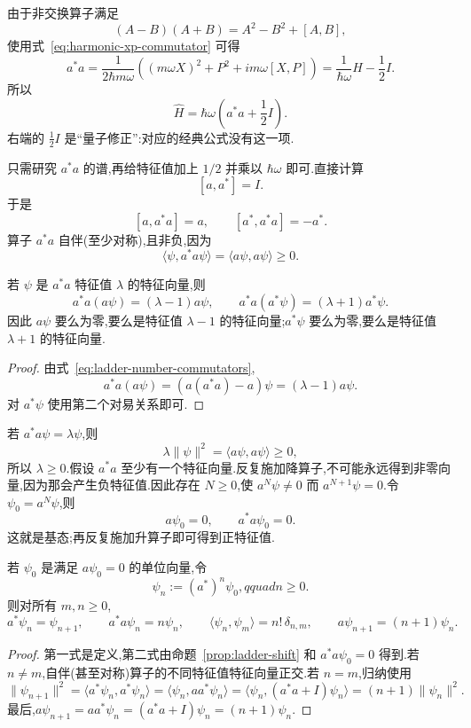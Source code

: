 由于非交换算子满足
\[
(A-B)(A+B)=A^{2}-B^{2}+[A,B],
\]
使用式~\eqref{eq:harmonic-xp-commutator} 可得
\[
a^{*}a=\frac{1}{2\hbar m\omega}\left((m\omega X)^{2}+P^{2}+im\omega[X,P]\right)
=\frac{1}{\hbar\omega}\widehat H-\frac12I.
\]
所以
\[
\widehat H=\hbar\omega\left(a^{*}a+\frac12I\right).
\label{eq:harmonic-hamiltonian-ladder}
\]
右端的 \(\frac12I\) 是“量子修正”:对应的经典公式没有这一项.

只需研究 \(a^{*}a\) 的谱,再给特征值加上 \(1/2\) 并乘以 \(\hbar\omega\) 即可.直接计算
\[
[a,a^{*}]=I.
\label{eq:ladder-commutator}
\]
于是
\[
[a,a^{*}a]=a,
\qquad
[a^{*},a^{*}a]=-a^{*}.
\label{eq:ladder-number-commutators}
\]
算子 \(a^{*}a\) 自伴(至少对称),且非负,因为
\[
\langle\psi,a^{*}a\psi\rangle=\langle a\psi,a\psi\rangle\geq0.
\]

\begin{proposition}[升降算子改变特征值]\label{prop:ladder-shift}
若 \(\psi\) 是 \(a^{*}a\) 特征值 \(\lambda\) 的特征向量,则
\[
a^{*}a(a\psi)=(\lambda-1)a\psi,
\qquad
a^{*}a(a^{*}\psi)=(\lambda+1)a^{*}\psi.
\]
因此 \(a\psi\) 要么为零,要么是特征值 \(\lambda-1\) 的特征向量;\(a^{*}\psi\) 要么为零,要么是特征值 \(\lambda+1\) 的特征向量.
\end{proposition}

\begin{proof}
由式~\eqref{eq:ladder-number-commutators},
\[
a^{*}a(a\psi)=(a(a^{*}a)-a)\psi=(\lambda-1)a\psi.
\]
对 \(a^{*}\psi\) 使用第二个对易关系即可.
\end{proof}

若 \(a^{*}a\psi=\lambda\psi\),则
\[
\lambda\|\psi\|^{2}=\langle a\psi,a\psi\rangle\geq0,
\]
所以 \(\lambda\geq0\).假设 \(a^{*}a\) 至少有一个特征向量.反复施加降算子,不可能永远得到非零向量,因为那会产生负特征值.因此存在 \(N\geq0\),使 \(a^{N}\psi\neq0\) 而 \(a^{N+1}\psi=0\).令 \(\psi_{0}=a^{N}\psi\),则
\[
a\psi_{0}=0,
\qquad
a^{*}a\psi_{0}=0.
\]
这就是基态;再反复施加升算子即可得到正特征值.

\begin{theorem}[谐振子的代数谱结构]\label{thm:harmonic-algebraic-structure}
若 \(\psi_{0}\) 是满足 \(a\psi_{0}=0\) 的单位向量,令
\[
\psi_{n}:=(a^{*})^{n}\psi_{0},qquad n\geq0.
\]
则对所有 \(m,n\geq0\),
\[
a^{*}\psi_{n}=\psi_{n+1},
\qquad
a^{*}a\psi_{n}=n\psi_{n},
\qquad
\langle\psi_{n},\psi_{m}\rangle=n!\,\delta_{n,m},
\qquad
a\psi_{n+1}=(n+1)\psi_{n}.
\label{eq:harmonic-chain-relations}
\]
\end{theorem}

\begin{proof}
第一式是定义,第二式由命题~\ref{prop:ladder-shift} 和 \(a^{*}a\psi_{0}=0\) 得到.若 \(n\neq m\),自伴(甚至对称)算子的不同特征值特征向量正交.若 \(n=m\),归纳使用
\[
\|\psi_{n+1}\|^{2}=\langle a^{*}\psi_{n},a^{*}\psi_{n}\rangle
=\langle\psi_{n},aa^{*}\psi_{n}\rangle
=\langle\psi_{n},(a^{*}a+I)\psi_{n}\rangle
=(n+1)\|\psi_{n}\|^{2}.
\]
最后,\(a\psi_{n+1}=aa^{*}\psi_{n}=(a^{*}a+I)\psi_{n}=(n+1)\psi_{n}\).
\end{proof}


